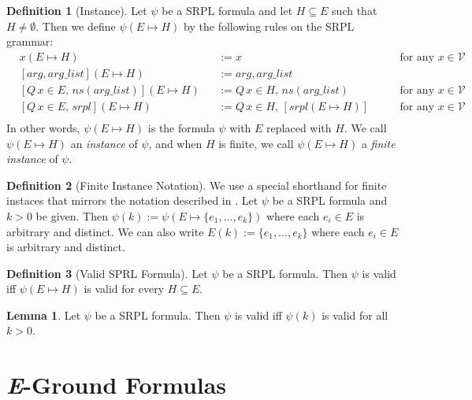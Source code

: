 \documentclass[12pt]{article}
\theoremstyle{definition}
\newtheorem{lemma}{Lemma}
\newtheorem{definition}{Definition}
\theoremstyle{remark}
\begin{document}
\begin{definition}[Instance]
  Let $\psi$ be a SRPL formula and let $H \subseteq E$ such that $H \neq \emptyset$.  Then we define $\psi(E \mapsto H)$ by the following rules on the SRPL grammar:
  \begin{align*}
    &x(E \mapsto H)& &:= x \qquad &\text{for any } x \in \mathcal{V}\\
    &[arg,arg\_list](E \mapsto H)& &:= arg,arg\_list\\
    &[Q \, x \in E, \, ns(arg\_list)](E \mapsto H)& &:= Q \, x \in H, \, ns(arg\_list) \qquad &\text{for any } x \in \mathcal{V}\\
    &[Q \, x \in E, \, srpl](E \mapsto H)& &:=Q \, x \in H, \, [srpl(E \mapsto H)]  \qquad &\text{for any } x \in \mathcal{V}\\
  \end{align*}
  In other words, $\psi(E \mapsto H)$ is the formula $\psi$ with $E$ replaced with $H$.  We call $\psi(E \mapsto H)$ an \textit{instance} of $\psi$, and when $H$ is finite, we call $\psi(E \mapsto H)$ a \textit{finite instance} of $\psi$.
\end{definition}

\begin{definition}[Finite Instance Notation]
  We use a special shorthand for finite instaces that mirrors the notation described in \cite{goel2021symmetry}.  Let $\psi$ be a SRPL formula and $k>0$ be given.  Then $\psi(k) := \psi(E \mapsto \{e_1,...,e_k\})$ where each $e_i \in E$ is arbitrary and distinct.  We can also write $E(k) := \{e_1,...,e_k\}$ where each $e_i \in E$ is arbitrary and distinct.
\end{definition}

\begin{definition}[Valid SPRL Formula]
  Let $\psi$ be a SRPL formula.  Then $\psi$ is valid iff $\psi(E \mapsto H)$ is valid for every $H \subseteq E$.
\end{definition}

\begin{lemma}
  \label{lem:valid-all-k}
  Let $\psi$ be a SRPL formula.  Then $\psi$ is valid iff $\psi(k)$ is valid for all $k>0$.
\end{lemma}



\section{\textit{E}-Ground Formulas}
\end{document}
